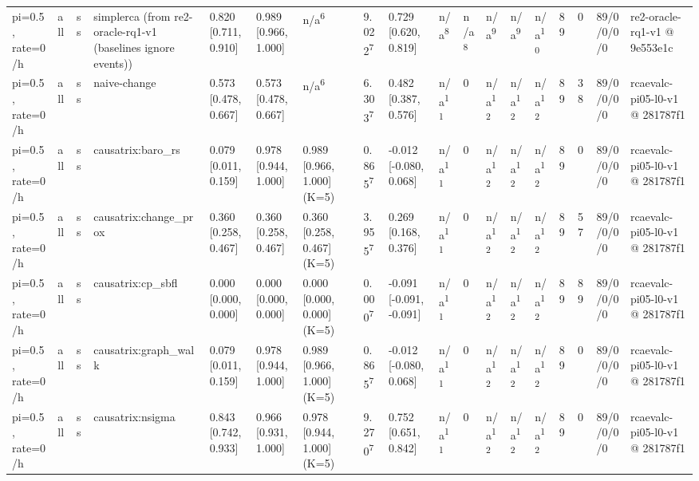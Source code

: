 \begin{table}[t]
\begin{tabular}{llllllllllllllllll}
pi=0.5, rate=0/h & all & ss & simplerca (from re2-oracle-rq1-v1 (baselines ignore events)) & 0.820 [0.711, 0.910] & 0.989 [0.966, 1.000] & n/a\textsuperscript{6} & 9.022\textsuperscript{7} & 0.729 [0.620, 0.819] & n/a\textsuperscript{8} & n/a\textsuperscript{8} & n/a\textsuperscript{9} & n/a\textsuperscript{9} & n/a\textsuperscript{10} & 89 & 0 & 89/0/0/0/0 & re2-oracle-rq1-v1 @ 9e553e1c \\
pi=0.5, rate=0/h & all & ss & naive-change & 0.573 [0.478, 0.667] & 0.573 [0.478, 0.667] & n/a\textsuperscript{6} & 6.303\textsuperscript{7} & 0.482 [0.387, 0.576] & n/a\textsuperscript{11} & 0 & n/a\textsuperscript{12} & n/a\textsuperscript{12} & n/a\textsuperscript{12} & 89 & 38 & 89/0/0/0/0 & rcaevalc-pi05-l0-v1 @ 281787f1 \\
pi=0.5, rate=0/h & all & ss & causatrix:baro\_rs & 0.079 [0.011, 0.159] & 0.978 [0.944, 1.000] & 0.989 [0.966, 1.000] (K=5) & 0.865\textsuperscript{7} & -0.012 [-0.080, 0.068] & n/a\textsuperscript{11} & 0 & n/a\textsuperscript{12} & n/a\textsuperscript{12} & n/a\textsuperscript{12} & 89 & 0 & 89/0/0/0/0 & rcaevalc-pi05-l0-v1 @ 281787f1 \\
pi=0.5, rate=0/h & all & ss & causatrix:change\_prox & 0.360 [0.258, 0.467] & 0.360 [0.258, 0.467] & 0.360 [0.258, 0.467] (K=5) & 3.955\textsuperscript{7} & 0.269 [0.168, 0.376] & n/a\textsuperscript{11} & 0 & n/a\textsuperscript{12} & n/a\textsuperscript{12} & n/a\textsuperscript{12} & 89 & 57 & 89/0/0/0/0 & rcaevalc-pi05-l0-v1 @ 281787f1 \\
pi=0.5, rate=0/h & all & ss & causatrix:cp\_sbfl & 0.000 [0.000, 0.000] & 0.000 [0.000, 0.000] & 0.000 [0.000, 0.000] (K=5) & 0.000\textsuperscript{7} & -0.091 [-0.091, -0.091] & n/a\textsuperscript{11} & 0 & n/a\textsuperscript{12} & n/a\textsuperscript{12} & n/a\textsuperscript{12} & 89 & 89 & 89/0/0/0/0 & rcaevalc-pi05-l0-v1 @ 281787f1 \\
pi=0.5, rate=0/h & all & ss & causatrix:graph\_walk & 0.079 [0.011, 0.159] & 0.978 [0.944, 1.000] & 0.989 [0.966, 1.000] (K=5) & 0.865\textsuperscript{7} & -0.012 [-0.080, 0.068] & n/a\textsuperscript{11} & 0 & n/a\textsuperscript{12} & n/a\textsuperscript{12} & n/a\textsuperscript{12} & 89 & 0 & 89/0/0/0/0 & rcaevalc-pi05-l0-v1 @ 281787f1 \\
pi=0.5, rate=0/h & all & ss & causatrix:nsigma & 0.843 [0.742, 0.933] & 0.966 [0.931, 1.000] & 0.978 [0.944, 1.000] (K=5) & 9.270\textsuperscript{7} & 0.752 [0.651, 0.842] & n/a\textsuperscript{11} & 0 & n/a\textsuperscript{12} & n/a\textsuperscript{12} & n/a\textsuperscript{12} & 89 & 0 & 89/0/0/0/0 & rcaevalc-pi05-l0-v1 @ 281787f1 \\

\end{tabular}
\end{table}
